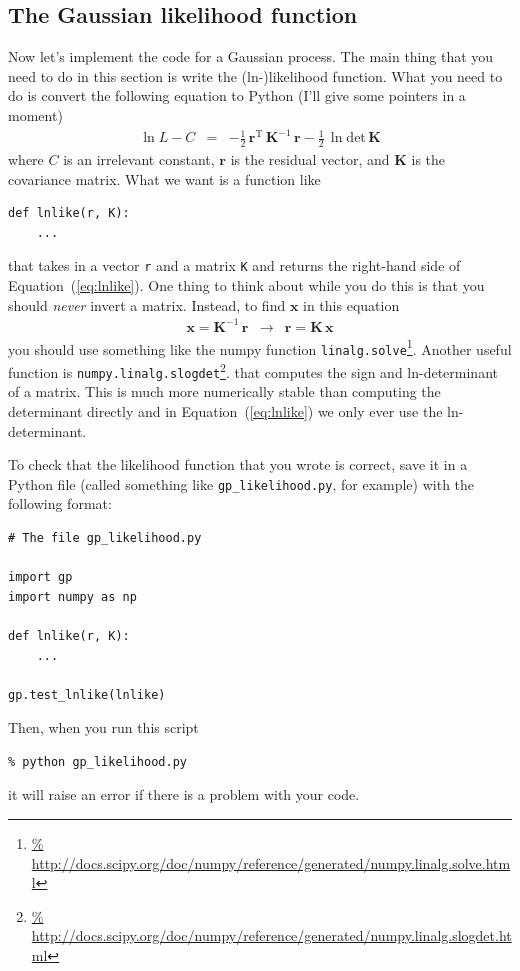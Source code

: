 \documentclass[12pt,preprint]{aastex}
\newcommand{\project}[1]{{\sffamily #1}}
\newcommand{\Eq}[1]{Equation~(\ref{eq:#1})}
\newcommand{\eq}[1]{\Eq{#1}}
\newcommand{\eqlabel}[1]{\label{eq:#1}}
\newcommand{\bvec}[1]{\ensuremath{\boldsymbol{#1}}}
\begin{document}
\subsection{The Gaussian likelihood function}

Now let's implement the code for a Gaussian process.
The main thing that you need to do in this section is write the
(ln-)likelihood function.
What you need to do is convert the following equation to Python (I'll give
some pointers in a moment)
\begin{eqnarray}\eqlabel{lnlike}
\ln L - C &=& -\frac{1}{2}\,\bvec{r}^\mathrm{T}\,\bvec{K}^{-1}\,\bvec{r}
              -\frac{1}{2}\,\ln \mathrm{det}\,\bvec{K}
\end{eqnarray}
where $C$ is an irrelevant constant, $\bvec{r}$ is the residual vector, and
$\bvec{K}$ is the covariance matrix.
What we want is a function like
\begin{lstlisting}
def lnlike(r, K):
    ...
\end{lstlisting}
that takes in a vector \texttt{r} and a matrix \texttt{K} and returns the
right-hand side of \eq{lnlike}.
One thing to think about while you do this is that you should \emph{never}
invert a matrix.
Instead, to find $\bvec{x}$ in this equation
\begin{eqnarray}
\bvec{x} = \bvec{K}^{-1}\,\bvec{r} &\to& \bvec{r} = \bvec{K}\,\bvec{x}
\end{eqnarray}
you should use something like the \project{numpy} function
\texttt{linalg.solve}\footnote{\url{%
http://docs.scipy.org/doc/numpy/reference/generated/numpy.linalg.solve.html}}.
Another useful function is \texttt{numpy.linalg.slogdet}\footnote{\url{%
http://docs.scipy.org/doc/numpy/reference/generated/numpy.linalg.slogdet.html}}.
that computes the sign and ln-determinant of a matrix.
This is much more numerically stable than computing the determinant directly
and in \eq{lnlike} we only ever use the ln-determinant.

To check that the likelihood function that you wrote is correct, save it in a
Python file (called something like \texttt{gp\_likelihood.py}, for example)
with the following format:
\begin{lstlisting}[frame=single]
# The file gp_likelihood.py

import gp
import numpy as np

def lnlike(r, K):
    ...

gp.test_lnlike(lnlike)
\end{lstlisting}
Then, when you run this script
\begin{lstlisting}
% python gp_likelihood.py
\end{lstlisting}
it will raise an error if there is a problem with your code.
\end{document}
